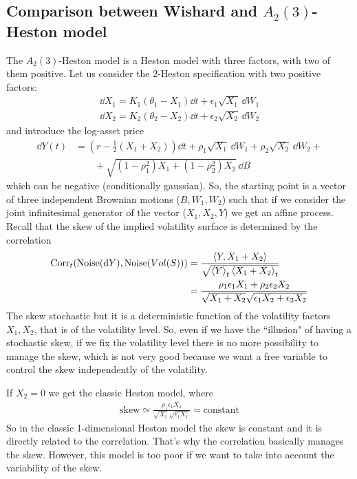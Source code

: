 \subsection{Comparison between Wishard and \texorpdfstring{$A_2(3)$}{A_2(3)}-Heston model}
The $A_2(3)$-Heston model is a Heston model with three factors, with two of them positive. Let us consider the 2-Heston specification with two positive factors:
\begin{align*}
    \dd X_1 = K_1(\theta_1-X_1)\dd t + \epsilon_1\sqrt{X_1}\,\dd W_1 \\
    \dd X_2 = K_2(\theta_2 - X_2)\dd t + \epsilon_2\sqrt{X_2}\,\dd W_2
\end{align*}
and introduce the log-asset price
\begin{align*}
    \dd Y(t) &= \left(r-\frac{1}{2}(X_1+X_2)\right)\dd t + \rho_1\sqrt{X_1}\,\dd W_1 + \rho_2\sqrt{X_2}\,\dd W_2 + \\
    &\qquad
    +\sqrt{(1-\rho_1^2)X_1 + (1-\rho_2^2)X_2}\,\dd B
\end{align*}
which can be negative (conditionally gaussian). So, the starting point is a vector of three independent Brownian motions ($B, W_1, W_2$) such that if we consider the joint infinitesimal generator of the vector ($X_1, X_2, Y$) we get an affine process. Recall that the skew of the implied volatility surface is determined by the correlation
\begin{align*}
    \operatorname{Corr}_t(\text{Noise}(\dd Y), \text{Noise}(Vol(S))) &= \frac{\expval{Y, X_1+X_2}}{\sqrt{\expval{Y}_t\expval{X_1+X_2}_t}} \\
    &=
    \frac{\rho_1\epsilon_1X_1 + \rho_2\epsilon_2X_2}{\sqrt{X_1+X_2}\sqrt{\epsilon_1X_2+\epsilon_2X_2}}
\end{align*}
The skew stochastic but it is a deterministic function of the volatility factors $X_1, X_2$, that is of the volatility level. So, even if we have the ``illusion" of having a stochastic skew, if we fix the volatility level there is no more possibility to manage the skew, which is not very good because we want a free variable to control the skew independently of the volatility.
\begin{remark}
    If $X_2=0$ we get the classic Heston model, where
    \begin{align*}
        \text{skew} \simeq \frac{\rho_1\epsilon_1X_1}{\sqrt{X_1}\sqrt{\epsilon_1X_1}} = \text{constant}
    \end{align*}
    So in the classic 1-dimensional Heston model the skew is constant and it is directly related to the correlation. That's why the correlation basically manages the skew. However, this model is too poor if we want to take into account the variability of the skew.
\end{remark}
